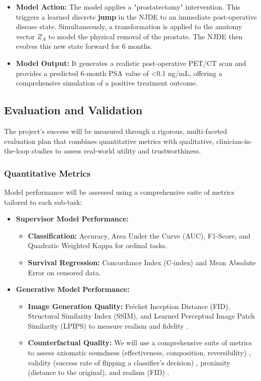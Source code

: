 \documentclass[11pt, a4paper]{article}
\begin{document}
\begin{enumerate}
    \begin{itemize}
        \item \textbf{Model Action:} The model applies a "prostatectomy" intervention. This triggers a learned discrete \textbf{jump} in the NJDE to an immediate post-operative disease state. Simultaneously, a transformation is applied to the anatomy vector $Z_A$ to model the physical removal of the prostate. The NJDE then evolves this new state forward for 6 months.
        \item \textbf{Model Output:} It generates a realistic post-operative PET/CT scan and provides a predicted 6-month PSA value of <0.1 ng/mL, offering a comprehensive simulation of a positive treatment outcome.
    \end{itemize}
\end{enumerate}

\subsection{Evaluation and Validation}
The project's success will be measured through a rigorous, multi-faceted evaluation plan that combines quantitative metrics with qualitative, clinician-in-the-loop studies to assess real-world utility and trustworthiness.

\subsubsection{Quantitative Metrics}
Model performance will be assessed using a comprehensive suite of metrics tailored to each sub-task:
\begin{itemize}
    \item \textbf{Supervisor Model Performance:}
        \begin{itemize}
            \item \textbf{Classification:} Accuracy, Area Under the Curve (AUC), F1-Score, and Quadratic Weighted Kappa for ordinal tasks.
            \item \textbf{Survival Regression:} Concordance Index (C-index) and Mean Absolute Error on censored data.
        \end{itemize}
    \item \textbf{Generative Model Performance:}
        \begin{itemize}
            \item \textbf{Image Generation Quality:} Fréchet Inception Distance (FID), Structural Similarity Index (SSIM), and Learned Perceptual Image Patch Similarity (LPIPS) to measure realism and fidelity \cite{VigneshwaranOhara2024, Singla2022}.
            \item \textbf{Counterfactual Quality:} We will use a comprehensive suite of metrics to assess axiomatic soundness (effectiveness, composition, reversibility) \cite{KomanduriWu2023, MonteiroRibeiro2023}, validity (success rate of flipping a classifier’s decision) \cite{SinglaEslami2021, Singla2022}, proximity (distance to the original), and realism (FID) \cite{GuoDeng2024}.
        \end{itemize}
\end{itemize}
\end{document}
